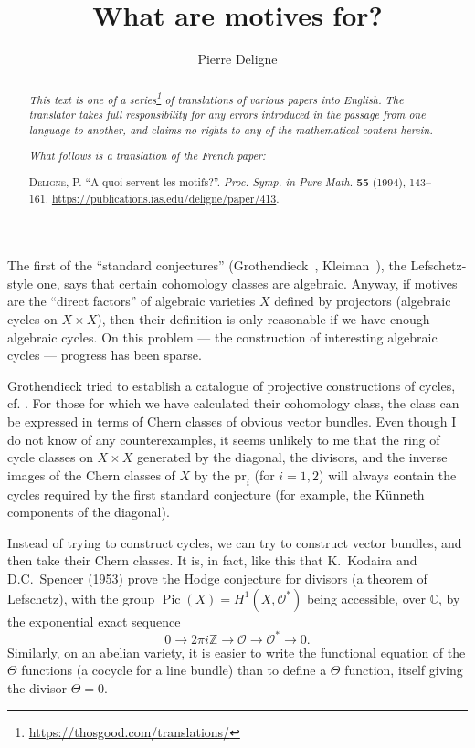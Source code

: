 \documentclass{article}
\title{What are motives for?}
\author{Pierre Deligne}
\date{}
\theoremstyle{plain}
\theoremstyle{definition}
\newcommand{\sh}[1]{{\mathscr{#1}}}
\newcommand{\pr}{\mathrm{pr}}
\newcommand{\ZZ}{\mathbb{Z}}
\newcommand{\CC}{\mathbb{C}}
\DeclareMathOperator{\Pic}{Pic}
\newcommand{\oldpage}[1]{\marginpar{\footnotesize$\Big\vert$ \textit{p.~#1}}}
\begin{document}
\maketitle
\thispagestyle{fancy}

\renewcommand{\abstractname}{Translator's note.}

\begin{abstract}
  \renewcommand*{\thefootnote}{\fnsymbol{footnote}}
  \emph{This text is one of a series\footnote{\url{https://thosgood.com/translations/}} of translations of various papers into English.}
  \emph{The translator takes full responsibility for any errors introduced in the passage from one language to another, and claims no rights to any of the mathematical content herein.}
  
  \emph{What follows is a translation of the French paper:}

  \medskip\noindent
  \textsc{Deligne, P.}
  ``A quoi servent les motifs?''.
  \emph{Proc. Symp. in Pure Math.} \textbf{55} (1994), 143--161.
  {\url{https://publications.ias.edu/deligne/paper/413}}.
\end{abstract}

\setcounter{footnote}{0}

\setcounter{tocdepth}{1}
\tableofcontents
\bigskip



\oldpage{143}
The first of the ``standard conjectures'' (Grothendieck~\cite{19}, Kleiman~\cite{20}), the Lefschetz-style one, says that certain cohomology classes are algebraic.
Anyway, if motives are the ``direct factors'' of algebraic varieties $X$ defined by projectors (algebraic cycles on $X\times X$), then their definition is only reasonable if we have enough algebraic cycles.
On this problem --- the construction of interesting algebraic cycles --- progress has been sparse.

Grothendieck tried to establish a catalogue of projective constructions of cycles, cf. \cite[p.~197]{19}.
For those for which we have calculated their cohomology class, the class can be expressed in terms of Chern classes of obvious vector bundles.
Even though I do not know of any counterexamples, it seems unlikely to me that the ring of cycle classes on $X\times X$ generated by the diagonal, the divisors, and the inverse images of the Chern classes of $X$ by the $\pr_i$ (for $i=1,2$) will always contain the cycles required by the first standard conjecture (for example, the K\"{u}nneth components of the diagonal).

Instead of trying to construct cycles, we can try to construct vector bundles, and then take their Chern classes.
It is, in fact, like this that K.~Kodaira and D.C.~Spencer (1953) prove the Hodge conjecture for divisors (a theorem of Lefschetz), with the group $\Pic(X)=H^1(X,\sh{O}^*)$ being accessible, over $\CC$, by the exponential exact sequence
\[
  0 \to 2\pi i\ZZ \to \sh{O} \to \sh{O}^* \to 0.
\]
Similarly, on an abelian variety, it is easier to write the functional equation of the $\Theta$ functions (a cocycle for a line bundle) than to define a $\Theta$ function, itself giving the divisor $\Theta=0$.
\end{document}
